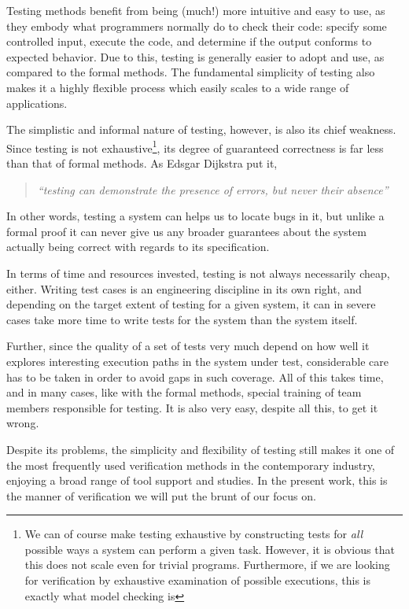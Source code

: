 \documentclass{article}
\newcommand{\tmem}[1]{{\em #1\/}}
\begin{document}
Testing methods benefit from being (much!) more intuitive and easy to use, as
they embody what programmers normally do to check their code: specify some
controlled input, execute the code, and determine if the output conforms to
expected behavior. Due to this, testing is generally easier to adopt and use,
as compared to the formal methods. The fundamental simplicity of testing also
makes it a highly flexible process which easily scales to a wide range of
applications.



The simplistic and informal nature of testing, however, is also its chief
weakness. Since testing is not exhaustive{\footnote{We can of course make
testing exhaustive by constructing tests for {\tmem{all}} possible ways a
system can perform a given task. However, it is obvious that this does not
scale even for trivial programs. Furthermore, if we are looking for
verification by exhaustive examination of possible executions, this is exactly
what model checking is}}, its degree of guaranteed correctness is far less
than that of formal methods. As Edsgar Dijkstra put it,

\begin{quote}
  {\tmem{``testing can demonstrate the presence of errors, but never their
  absence''}}
\end{quote}

In other words, testing a system can helps us to locate bugs in it, but unlike
a formal proof it can never give us any broader guarantees about the system
actually being correct with regards to its specification.



In terms of time and resources invested, testing is not always necessarily
cheap, either. Writing test cases is an engineering discipline in its own
right, and depending on the target extent of testing for a given system, it
can in severe cases take more time to write tests for the system than the
system itself.

Further, since the quality of a set of tests very much depend on how well it
explores interesting execution paths in the system under test, considerable
care has to be taken in order to avoid gaps in such coverage. All of this
takes time, and in many cases, like with the formal methods, special training
of team members responsible for testing. It is also very easy, despite all
this, to get it wrong.



Despite its problems, the simplicity and flexibility of testing still makes
it one of the most frequently used verification methods in the contemporary
industry, enjoying a broad range of tool support and studies. In the present
work, this is the manner of verification we will put the brunt of our focus
on.
\end{document}
